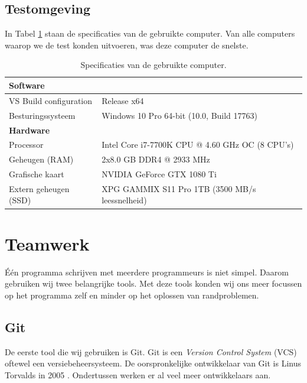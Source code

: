 \subsection{Testomgeving}
In Tabel \ref{tab:pc-specs} staan de specificaties van de gebruikte computer. Van alle computers waarop we de test konden uitvoeren, was deze computer de snelste.

\begin{table}[ht]
    \centering
    \begin{tabular}{|l|l|}
        \hline
        \multicolumn{2}{|l|}{\bfseries Software} \\
        \hline
        VS Build configuration  & Release x64 \\
        Besturingssysteem       & Windows 10 Pro 64-bit (10.0, Build 17763) \\
        \hline
        \hline
        \multicolumn{2}{|l|}{\bfseries Hardware} \\
        \hline
        Processor               & Intel Core i7-7700K CPU @ 4.60 GHz OC (8 CPU's) \\
        Geheugen (RAM)          & 2x8.0 GB DDR4 @ 2933 MHz \\
        Grafische kaart         & NVIDIA GeForce GTX 1080 Ti \\
        Extern geheugen (SSD)   & XPG GAMMIX S11 Pro 1TB (3500 MB/s leessnelheid)\\
        \hline
    \end{tabular}
    \caption{Specificaties van de gebruikte computer.}
    \label{tab:pc-specs}
\end{table}

\clearpage

\section{Teamwerk}
Één programma schrijven met meerdere programmeurs is niet simpel. Daarom gebruiken wij twee belangrijke tools. Met deze tools konden wij ons meer focussen op het programma zelf en minder op het oplossen van randproblemen.

\subsection{Git}
De eerste tool die wij gebruiken is Git.
Git is een \textit{Version Control System} (VCS) oftewel een versiebeheersysteem. De oorspronkelijke ontwikkelaar van Git is Linus Torvalds in 2005 \cite{git:init}. Ondertussen werken er al veel meer ontwikkelaars aan.

